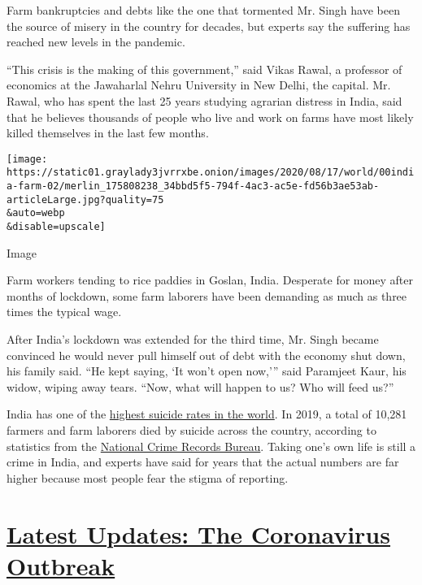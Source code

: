 Farm bankruptcies and debts like the one that tormented Mr. Singh have
been the source of misery in the country for decades, but experts say
the suffering has reached new levels in the pandemic.

``This crisis is the making of this government,'' said Vikas Rawal, a
professor of economics at the Jawaharlal Nehru University in New Delhi,
the capital. Mr. Rawal, who has spent the last 25 years studying
agrarian distress in India, said that he believes thousands of people
who live and work on farms have most likely killed themselves in the
last few months.

\texttt{[image: https://static01.graylady3jvrrxbe.onion/images/2020/08/17/world/00india-farm-02/merlin\_175808238\_34bbd5f5-794f-4ac3-ac5e-fd56b3ae53ab-articleLarge.jpg?quality=75\\\&auto=webp\\\&disable=upscale]}

Image

Farm workers tending to rice paddies in Goslan, India. Desperate for
money after months of lockdown, some farm laborers have been demanding
as much as three times the typical wage.~~

After India's lockdown was extended for the third time, Mr. Singh became
convinced he would never pull himself out of debt with the economy shut
down, his family said. ``He kept saying, `It won't open now,''' said
Paramjeet Kaur, his widow, wiping away tears. ``Now, what will happen to
us? Who will feed us?''

India has one of the
\href{https://apps.who.int/iris/bitstream/handle/10665/131056/9789241564878_eng.pdf?sequence=8}{highest
suicide rates in the world}. In 2019, a total of 10,281 farmers and farm
laborers died by suicide across the country, according to statistics
from the
\href{https://ncrb.gov.in/sites/default/files/ADSI-2019-FULL-REPORT.pdf}{National
Crime Records Bureau}. Taking one's own life is still a crime in India,
and experts have said for years that the actual numbers are far higher
because most people fear the stigma of reporting.

\hypertarget{latest-updates-the-coronavirus-outbreak}{%
\section{\texorpdfstring{\href{https://www.nytimes3xbfgragh.onion/2020/09/09/world/covid-19-coronavirus.html?action=click\&pgtype=Article\&state=default\&region=MAIN_CONTENT_1\&context=storylines_live_updates}{Latest
Updates: The Coronavirus
Outbreak}}{Latest Updates: The Coronavirus Outbreak}}\label{latest-updates-the-coronavirus-outbreak}}

